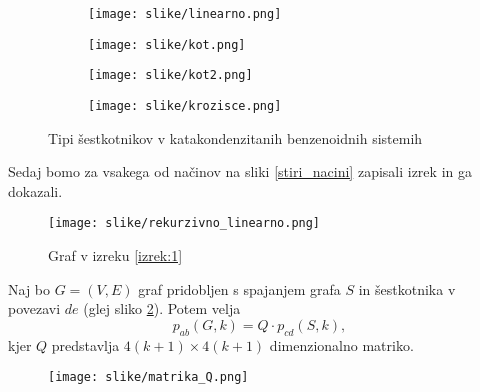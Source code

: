 \documentclass[mat1, tisk]{fmfdelo}
\begin{document}
\begin{figure}[h!]
  \centering
    \begin{subfigure}{.24\textwidth}
      \centering
      \texttt{[image: slike/linearno.png]}
    \end{subfigure}%
    \begin{subfigure}{.24\textwidth}
      \centering
      \texttt{[image: slike/kot.png]}
    \end{subfigure}
    \begin{subfigure}{.24\textwidth}
      \centering
      \texttt{[image: slike/kot2.png]}
    \end{subfigure}
    \begin{subfigure}{.24\textwidth}
      \centering
      \texttt{[image: slike/krozisce.png]}
    \end{subfigure}
  \caption{Tipi šestkotnikov v katakondenzitanih benzenoidnih sistemih}
  \label{fig:stiri_nacini}
\end{figure}
Sedaj bomo 
za vsakega od načinov na sliki \ref{stiri_nacini} 
zapisali izrek in ga dokazali.

\begin{figure}[h!]
  \centering
  \texttt{[image: slike/rekurzivno\_linearno.png]}
  \caption{Graf v izreku \ref{izrek:1}}
  \label{fig:rekurzivno_linearno}
\end{figure}
\begin{izrek}
  Naj bo $G = (V, E)$ graf pridobljen s 
  spajanjem grafa $S$ in šestkotnika 
  v povezavi $de$ (glej sliko \ref{fig:rekurzivno_linearno}). Potem velja
  $$p_{ab}(G,k) = Q \cdot p_{cd}(S,k),$$
  kjer $Q$ predstavlja $4(k+1) \times 4(k+1)$ dimenzionalno matriko.  
  \begin{figure}[H]
    \centering
    \texttt{[image: slike/matrika\_Q.png]}
    \label{fig:Q}
  \end{figure}
  \label{izrek:1}
\end{izrek}
\end{document}
